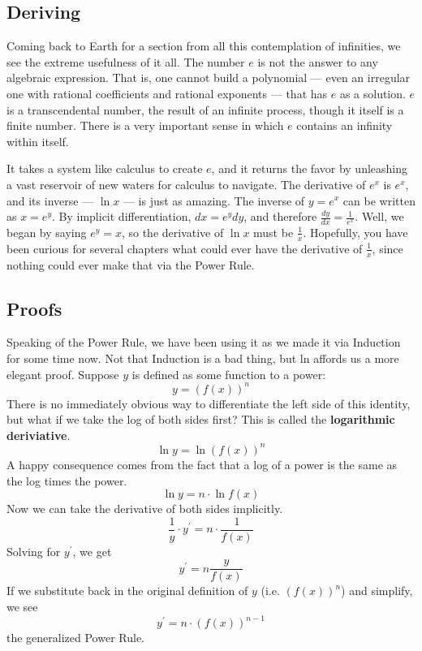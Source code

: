 
\subsection{Deriving}



Coming back to Earth for a section from all this contemplation of infinities, we see the
extreme usefulness of it all.  The number $e$ is not the answer to any algebraic 
expression.  That is, one cannot build a polynomial --- even an irregular one with
rational coefficients and rational exponents --- that has $e$ as a solution.  $e$ is a
transcendental number, the result of an infinite process, though it itself is a finite number.
There is a very important sense in which $e$ contains an infinity within itself.

It takes a system like calculus to create $e$, and it returns the favor by unleashing a
vast reservoir of new waters for calculus to navigate.  The derivative of $e^x$ is $e^x$,
and its inverse --- $\ln{x}$ --- is just as amazing.  The inverse of $y=e^x$ can be written
as $x=e^y$.  By implicit differentiation, $dx = e^ydy$, and therefore $\frac{dy}{dx} =
\frac{1}{e^x}$.  Well, we began by saying $e^y=x$, so the derivative of $\ln{x}$ must
be $\frac{1}{x}$.  Hopefully, you have been curious for several chapters what
could ever have the derivative of $\frac{1}{x}$, since nothing could ever make that
via the Power Rule.

\subsection{Proofs}
Speaking of the Power Rule, we have been using it as we made it via Induction for 
some time now.  Not that Induction is a bad thing, but ln affords us a more elegant 
proof.  Suppose $y$ is defined as some function to a power:
$$
y = \left(f(x)\right)^n
$$
There is no immediately obvious way to differentiate the left side of this identity, but
what if we take the log of both sides first?  This is called the \textbf{logarithmic deriviative}.
$$
\ln{y} = \ln{\left(f(x)\right)^n}
$$
A happy consequence comes from the fact that a log of a power is the same as the
log times the power.
$$
\ln{y} = n\cdot\ln{f(x)}
$$
Now we can take the derivative of both sides implicitly.
$$
\frac{1}{y} \cdot y^\prime = n \cdot \frac{1}{f(x)}
$$
Solving for $y^\prime$, we get
$$
y^\prime = n \frac{y}{f(x)}
$$
If we substitute back in the original definition of $y$ (i.e. $\left(f(x)\right)^n$) and simplify,
we see
\begin{equation}
y^\prime = n\cdot{}\left(f(x)\right)^{n-1}
\end{equation}
the generalized Power Rule.


